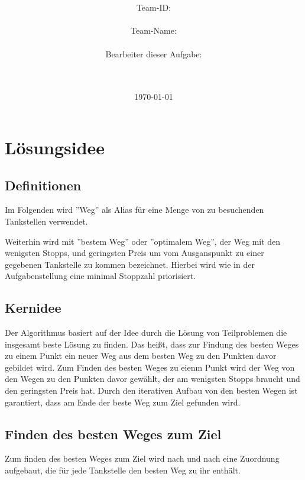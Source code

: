 \documentclass[a4paper,10pt,ngerman]{scrartcl}
\title{\textbf{\Huge\Aufgabe}}
\author{\LARGE Team-ID: \LARGE \TeamID \\\\
	    \LARGE Team-Name: \LARGE \TeamName \\\\
	    \LARGE Bearbeiter dieser Aufgabe: \\ 
	    \LARGE \Namen\\\\}
\date{\LARGE\today}
\begin{document}
\maketitle
\tableofcontents

\vspace{0.5cm}

\section{Lösungsidee}

\subsection{Definitionen}

Im Folgenden wird ''Weg'' als Alias für eine Menge von zu besuchenden Tankstellen verwendet.

Weiterhin wird mit ''bestem Weg'' oder ''optimalem Weg'', der Weg mit den wenigsten Stopps, und geringsten Preis um vom Ausganspunkt zu einer gegebenen Tankstelle zu kommen bezeichnet. Hierbei wird wie in der Aufgabenstellung eine minimal Stoppzahl priorisiert.

\subsection{Kernidee}

Der Algorithmus basiert auf der Idee durch die Lösung von Teilproblemen die insgesamt beste Lösung zu finden. Das heißt, dass zur Findung des besten Weges zu einem Punkt ein neuer Weg aus dem besten Weg zu den Punkten davor gebildet wird. Zum Finden des besten Weges zu eienm Punkt wird der Weg von den Wegen zu den Punkten davor gewählt, der am wenigsten Stopps braucht und den geringsten Preis hat. Durch den iterativen Aufbau von den besten Wegen ist garantiert, dass am Ende der beste Weg zum Ziel gefunden wird.

\subsection{Finden des besten Weges zum Ziel}

Zum finden des besten Weges zum Ziel wird nach und nach eine Zuordnung aufgebaut, die für jede Tankstelle den besten Weg zu ihr enthält.
\end{document}
